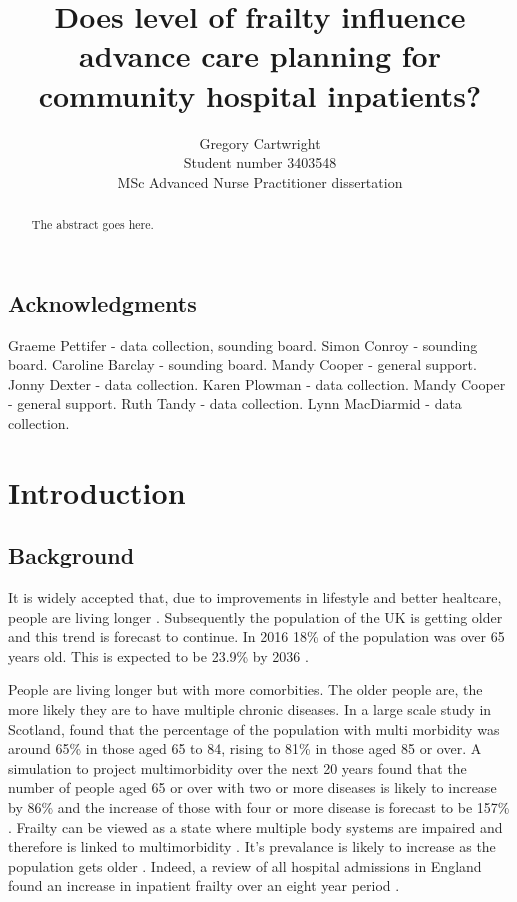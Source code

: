 \documentclass
[
	12pt,
	a4paper,
	oneside,
]{report}
\begin{document}
\author{Gregory Cartwright\\
	Student number 3403548\\
	MSc Advanced Nurse Practitioner dissertation
}
\title{Does level of frailty influence advance care planning 
	for community hospital inpatients?
}

\maketitle

\begin{abstract}
The abstract goes here.
\end{abstract}

\section*{Acknowledgments}
Graeme Pettifer - data collection, sounding board.
Simon Conroy - sounding board.
Caroline Barclay - sounding board.
Mandy Cooper - general support.
Jonny Dexter - data collection.
Karen Plowman - data collection.
Mandy Cooper - general support.
Ruth Tandy - data collection.
Lynn MacDiarmid - data collection.

\chapter{Introduction}

\section{Background}

It is widely accepted that, due to improvements in lifestyle and better healtcare, 
people are living longer \parencite{nao:08,ons:17}. Subsequently the population of 
the UK is getting older and this trend is forecast to continue.
In 2016 18\% of the population was over 65 years old. This is expected to be
23.9\% by 2036 \parencite{ons:17}.


People are living longer but with more comorbities. The older people are, the more
likely they are to have multiple chronic diseases. In a large scale study in
Scotland, \textcite{barnett:12} found that the percentage of the population with multi morbidity was around 
65\% in those aged 65 to 84, rising to 81\% in those aged 85 or over. A simulation 
to project multimorbidity over the next 20 years found that the number of people
aged 65 or over with two or more diseases is likely to increase by 86\% and the
increase of those with four or more disease is forecast to be 157\%
\parencite{kingston:18}. Frailty can be viewed as a state where multiple body 
systems are impaired and therefore is linked to multimorbidity
\parencite{woo:14}. It's prevalance is likely to increase as the population
gets older \parencite{sharp:13}. Indeed, a review of all hospital admissions in 
England found an increase in inpatient frailty over an eight year period 
\parencite{soong:15}.
\end{document}
